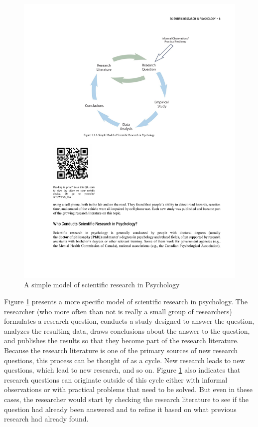 \begin{figure}[0in]
      \includegraphics[width=\linewidth]{figures/C1Figure1.pdf}
      \caption{A simple model of scientific research in Psychology}
      \label{fig:Theresearchcycle}
\end{figure}

Figure \ref{fig:Theresearchcycle} presents a more specific model of scientific research in psychology. The researcher (who more often than not is really a small group of researchers) formulates a research question, conducts a study designed to answer the question, analyzes the resulting data, draws conclusions about the answer to the question, and publishes the results so that they become part of the research literature. Because the research literature is one of the primary sources of new research questions, this process can be thought of as a cycle. New research leads to new questions, which lead to new research, and so on. Figure \ref{fig:Theresearchcycle} also indicates that research questions can originate outside of this cycle either with informal observations or with practical problems that need to be solved. But even in these cases, the researcher would start by checking the research literature to see if the question had already been answered and to refine it based on what previous research had already found.

